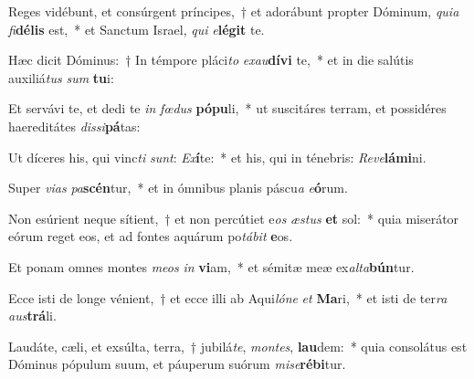 \item Reges vidébunt, et consúrgent príncipes,~† et adorábunt propter Dóminum, \textit{qui}\textit{a} \textit{fi}\textbf{dé}\textbf{lis} est,~* et Sanctum Israel, \textit{qui} \textit{e}\textbf{lé}\textbf{git} te.
\item Hæc dicit Dóminus:~† In témpore pláci\textit{to} \textit{ex}\textit{au}\textbf{dí}\textbf{vi} te,~* et in die salútis auxiliá\textit{tus} \textit{sum} \textbf{tu}i:
\item Et servávi te, et dedi te \textit{in} \textit{fœ}\textit{dus} \textbf{pó}\textbf{pu}li,~* ut suscitáres terram, et possidéres haereditátes \textit{dis}\textit{si}\textbf{pá}tas:
\item Ut díceres his, qui vinc\textit{ti} \textit{sunt}: \textit{Ex}\textbf{í}te:~* et his, qui in ténebris: \textit{Re}\textit{ve}\textbf{lá}\textbf{mi}ni.
\item Super \textit{vi}\textit{as} \textit{pa}\textbf{scén}tur,~* et in ómnibus planis páscu\textit{a} \textit{e}\textbf{ó}rum.
\item Non esúrient neque sítient,~† et non percútiet e\textit{os} \textit{æs}\textit{tus} \textbf{et} sol:~* quia miserátor eórum reget eos, et ad fontes aquárum po\textit{tá}\textit{bit} \textbf{e}os.
\item Et ponam omnes montes \textit{me}\textit{os} \textit{in} \textbf{vi}am,~* et sémitæ meæ ex\textit{al}\textit{ta}\textbf{bún}tur.
\item Ecce isti de longe vénient,~† et ecce illi ab Aqui\textit{ló}\textit{ne} \textit{et} \textbf{Ma}ri,~* et isti de ter\textit{ra} \textit{aus}\textbf{trá}li.
\item Laudáte, cæli, et exsúlta, terra,~† jubilá\textit{te}, \textit{mon}\textit{tes}, \textbf{lau}dem:~* quia consolátus est Dóminus pópulum suum, et páuperum suórum \textit{mi}\textit{se}\textbf{ré}\textbf{bi}tur.
